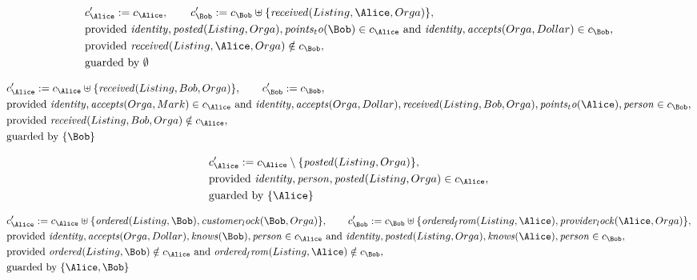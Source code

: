 \begin{align*}
&
c'_
{
\Alice
}
 := 
c_
{
\Alice
}
, \qquad 
c'_
{
\Bob
}
 := 
c_
{
\Bob
}
 \uplus 
\{
\mathit{
received
}
(
Listing
,
\Alice
,
Orga
)
\}
,\\
&
\text{provided } 
\mathit{
identity
}
,
\mathit{
posted
}
(
Listing
,
Orga
)
,
\mathit{
points_to
}
(
\Bob
)
 \in c_
{
\Alice
}
 \text{ and } 
\mathit{
identity
}
,
\mathit{
accepts
}
(
Orga
,
Dollar
)
 \in c_
{
\Bob
}
,\\
&
\text{provided } 
\mathit{
received
}
(
Listing
,
\Alice
,
Orga
)
 \notin c_
{
\Bob
}
,\\
&
\text{guarded by } \emptyset
\end{align*}

\begin{align*}
&
c'_
{
\Alice
}
 := 
c_
{
\Alice
}
 \uplus 
\{
\mathit{
received
}
(
Listing
,
Bob
,
Orga
)
\}
, \qquad 
c'_
{
\Bob
}
 := 
c_
{
\Bob
}
,\\
&
\text{provided } 
\mathit{
identity
}
,
\mathit{
accepts
}
(
Orga
,
Mark
)
 \in c_
{
\Alice
}
 \text{ and } 
\mathit{
identity
}
,
\mathit{
accepts
}
(
Orga
,
Dollar
)
,
\mathit{
received
}
(
Listing
,
Bob
,
Orga
)
,
\mathit{
points_to
}
(
\Alice
)
,
\mathit{
person
}
 \in c_
{
\Bob
}
,\\
&
\text{provided } 
\mathit{
received
}
(
Listing
,
Bob
,
Orga
)
 \notin c_
{
\Alice
}
,\\
&
\text{guarded by } \{
\Bob
\}
\end{align*}

\begin{align*}
&
c'_
{
\Alice
}
 := 
c_
{
\Alice
}
 \setminus 
\{
\mathit{
posted
}
(
Listing
,
Orga
)
\}
,\\
&
\text{provided } 
\mathit{
identity
}
,
\mathit{
person
}
,
\mathit{
posted
}
(
Listing
,
Orga
)
 \in c_
{
\Alice
}
,\\
&
\text{guarded by } \{
\Alice
\}
\end{align*}

\begin{align*}
&
c'_
{
\Alice
}
 := 
c_
{
\Alice
}
 \uplus 
\{
\mathit{
ordered
}
(
Listing
,
\Bob
)
,
\mathit{
customer_lock
}
(
\Bob
,
Orga
)
\}
, \qquad 
c'_
{
\Bob
}
 := 
c_
{
\Bob
}
 \uplus 
\{
\mathit{
ordered_from
}
(
Listing
,
\Alice
)
,
\mathit{
provider_lock
}
(
\Alice
,
Orga
)
\}
,\\
&
\text{provided } 
\mathit{
identity
}
,
\mathit{
accepts
}
(
Orga
,
Dollar
)
,
\mathit{
knows
}
(
\Bob
)
,
\mathit{
person
}
 \in c_
{
\Alice
}
 \text{ and } 
\mathit{
identity
}
,
\mathit{
posted
}
(
Listing
,
Orga
)
,
\mathit{
knows
}
(
\Alice
)
,
\mathit{
person
}
 \in c_
{
\Bob
}
,\\
&
\text{provided } 
\mathit{
ordered
}
(
Listing
,
\Bob
)
 \notin c_
{
\Alice
}
 \text{ and } 
\mathit{
ordered_from
}
(
Listing
,
\Alice
)
 \notin c_
{
\Bob
}
,\\
&
\text{guarded by } \{
\Alice
,
\Bob
\}
\end{align*}
